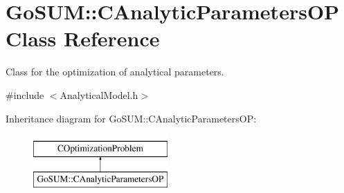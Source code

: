 \hypertarget{class_go_s_u_m_1_1_c_analytic_parameters_o_p}{\section{Go\-S\-U\-M\-:\-:C\-Analytic\-Parameters\-O\-P Class Reference}
\label{class_go_s_u_m_1_1_c_analytic_parameters_o_p}
}


Class for the optimization of analytical parameters.  




{\ttfamily \#include $<$Analytical\-Model.\-h$>$}

Inheritance diagram for Go\-S\-U\-M\-:\-:C\-Analytic\-Parameters\-O\-P\-:\begin{figure}[H]
\begin{center}
\leavevmode
\includegraphics[height=2.000000cm]{class_go_s_u_m_1_1_c_analytic_parameters_o_p}
\end{center}
\end{figure}
